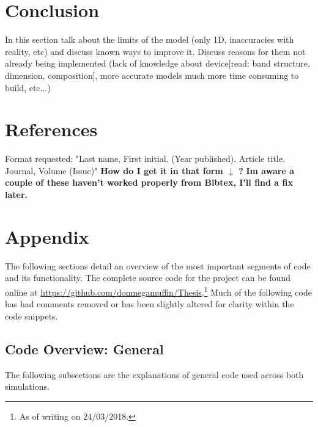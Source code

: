 \documentclass[titlepage]{article}
\begin{document}
\section{Conclusion}
In this section talk about the limits of the model (only 1D, inaccuracies with reality, etc) and discuss known ways to improve it. Discuss reasons for them not already being implemented (lack of knowledge about device[read: band structure, dimension, composition], more accurate models much more time consuming to build, etc...) \\


\section{References}
Format requested: "Last name, First initial. (Year published). Article title. Journal, Volume (Issue)" \textbf{How do I get it in that form $\downarrow$ ?} \textbf{Im aware a couple of these haven't worked properly from Bibtex, I'll find a fix later.}
{}

\newpage

\section{Appendix}
The following sections detail an overview of the most important segments of code and its functionality. The complete source code for the project can be found online at \url{https://github.com/donmegamuffin/Thesis}.\footnote{As of writing on 24/03/2018.} Much of the following code has had comments removed or has been slightly altered for clarity within the code snippets.
\subsection{Code Overview: General}
The following subsections are the explanations of general code used across both simulations.
\end{document}

